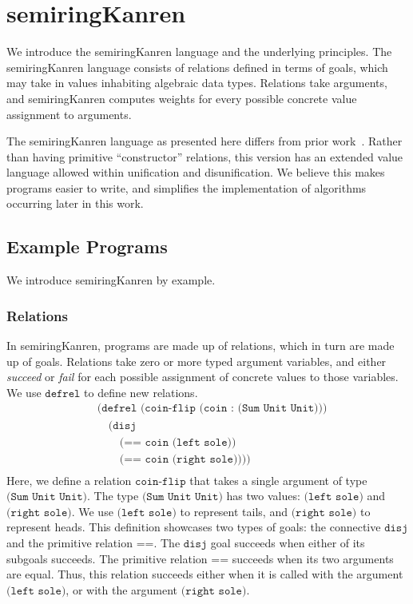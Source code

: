 \documentclass{report}
\theoremstyle{definition}
\begin{document}
\chapter{semiringKanren}

We introduce the semiringKanren language and the underlying principles.
The semiringKanren language consists of relations defined in terms of goals, which may take in values inhabiting algebraic data types.
Relations take arguments, and semiringKanren computes weights for every possible concrete value assignment to arguments.

The semiringKanren language as presented here differs from prior work~\cite{volkov2025}.
Rather than having primitive ``constructor'' relations, this version has an extended value language allowed within unification and disunification.
We believe this makes programs easier to write, and simplifies the implementation of algorithms occurring later in this work.

\section{Example Programs}

We introduce semiringKanren by example.

\subsection{Relations}

In semiringKanren, programs are made up of relations, which in turn are made up of goals.
Relations take zero or more typed argument variables, and either \emph{succeed} or \emph{fail} for each possible assignment of concrete values to those variables.
We use \(\texttt{defrel}\) to define new relations.
\begin{equation}
\begin{aligned}
	& \texttt{(defrel (coin-flip (coin : (Sum Unit Unit)))} \\
	& \quad \texttt{(disj} \\
	& \quad\quad \texttt{(== coin (left sole))} \\
	& \quad\quad \texttt{(== coin (right sole))))} \\
\end{aligned}
\end{equation}
Here, we define a relation \(\texttt{coin-flip}\) that takes a single argument of type \(\texttt{(Sum Unit Unit)}\).
The type \(\texttt{(Sum Unit Unit)}\) has two values: \(\texttt{(left sole)}\) and \(\texttt{(right sole)}\).
We use \(\texttt{(left sole)}\) to represent tails, and \(\texttt{(right sole)}\) to represent heads.
This definition showcases two types of goals: the connective \(\texttt{disj}\) and the primitive relation \(\texttt{==}\).
The \(\texttt{disj}\) goal succeeds when either of its subgoals succeeds.
The primitive relation \(\texttt{==}\) succeeds when its two arguments are equal.
Thus, this relation succeeds either when it is called with the argument \(\texttt{(left sole)}\), or with the argument \(\texttt{(right sole)}\).
\end{document}
